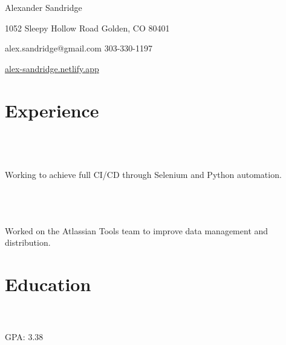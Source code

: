 \documentclass{resume}
\begin{document}
\ContactName
{Alexander Sandridge}

\bigskip

\ContactInfoPhysical
{1052 Sleepy Hollow Road}
{Golden, CO  80401}

\ContactInfoDigital
  {alex.sandridge@gmail.com}
  {303-330-1197}

{\faGlobeAmericas} \href{https://alex-sandridge.netlify.app/} {alex-sandridge.netlify.app}

\section{{\faBriefcase} Experience}
 \\
 \\
 \\
Working to achieve full CI/CD through Selenium and Python automation.

\bigskip
{} \\
 \\
 \\
Worked on the Atlassian Tools team to improve data management and distribution.

\section{{\faGraduationCap} Education}
 \\
 \\
GPA: 3.38 \\

\end{document}
